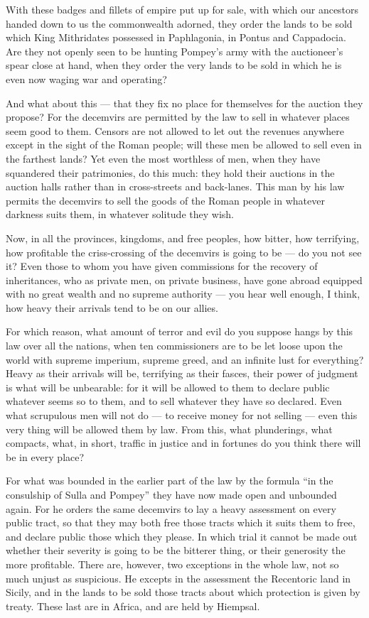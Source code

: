  With these badges and fillets of empire put up for sale, with which our ancestors handed down to us the commonwealth adorned, they order the lands to be sold which King Mithridates possessed in Paphlagonia, in Pontus and Cappadocia. Are they not openly seen to be hunting Pompey's army with the auctioneer's spear close at hand, when they order the very lands to be sold in which he is even now waging war and operating?

 And what about this --- that they fix no place for themselves for the auction they propose? For the decemvirs are permitted by the law to sell in whatever places seem good to them. Censors are not allowed to let out the revenues anywhere except in the sight of the Roman people; will these men be allowed to sell even in the farthest lands? Yet even the most worthless of men, when they have squandered their patrimonies, do this much: they hold their auctions in the auction halls rather than in cross-streets and back-lanes. This man by his law permits the decemvirs to sell the goods of the Roman people in whatever darkness suits them, in whatever solitude they wish.

 Now, in all the provinces, kingdoms, and free peoples, how bitter, how terrifying, how profitable the criss-crossing of the decemvirs is going to be --- do you not see it? Even those to whom you have given commissions for the recovery of inheritances, who as private men, on private business, have gone abroad equipped with no great wealth and no supreme authority --- you hear well enough, I think, how heavy their arrivals tend to be on our allies.

 For which reason, what amount of terror and evil do you suppose hangs by this law over all the nations, when ten commissioners are to be let loose upon the world with supreme imperium, supreme greed, and an infinite lust for everything? Heavy as their arrivals will be, terrifying as their fasces, their power of judgment is what will be unbearable: for it will be allowed to them to declare public whatever seems so to them, and to sell whatever they have so declared. Even what scrupulous men will not do --- to receive money for not selling --- even this very thing will be allowed them by law. From this, what plunderings, what compacts, what, in short, traffic in justice and in fortunes do you think there will be in every place?

 For what was bounded in the earlier part of the law by the formula ``in the consulship of Sulla and Pompey'' they have now made open and unbounded again. For he orders the same decemvirs to lay a heavy assessment on every public tract, so that they may both free those tracts which it suits them to free, and declare public those which they please. In which trial it cannot be made out whether their severity is going to be the bitterer thing, or their generosity the more profitable. There are, however, two exceptions in the whole law, not so much unjust as suspicious. He excepts in the assessment the Recentoric land in Sicily, and in the lands to be sold those tracts about which protection is given by treaty. These last are in Africa, and are held by Hiempsal.


